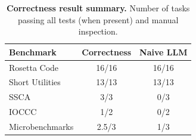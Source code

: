 \documentclass[nonacm,sigplan,review]{acmart}
\begin{document}
\begin{table}[htpb]
  \centering
  \caption{\textbf{Correctness result summary.} Number of tasks passing all tests (when present) and manual inspection.}
  \begin{tabular}{lcc}
    \toprule
    Benchmark & Correctness & Naive LLM \\
    \midrule
    Rosetta Code & 16/16 & 16/16  \\
    Short Utilities & 13/13 & 13/13 \\
    SSCA & 3/3 & 0/3 \\
    IOCCC & 1/2 & 0/2 \\
    Microbenchmarks & 2.5/3 & 1/3 \\
    \bottomrule
  \end{tabular}
\end{table}
\end{document}
